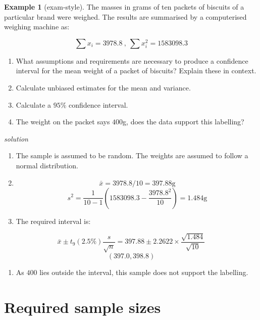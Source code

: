\documentclass[
]{book}
\providecommand{\tightlist}{%
  \setlength{\itemsep}{0pt}\setlength{\parskip}{0pt}}
\theoremstyle{definition}
\theoremstyle{definition}
\newtheorem{example}{Example}[chapter]
\theoremstyle{definition}
\theoremstyle{definition}
\theoremstyle{remark}
\begin{document}
\begin{example}[exam-style]

The masses in grams of ten packets of biscuits of a particular brand were weighed. The results are summarised by a computerised weighing machine as:

\[\sum x_i = 3978.8 \ , \ \sum x_i^2 = 1583098.3 \]

\begin{enumerate}
\def\labelenumi{\alph{enumi})}
\item
  What assumptions and requirements are necessary to produce a
  confidence interval for the mean weight of a packet of biscuits? Explain these in context.
\item
  Calculate unbiased estimates for the mean and variance.
\item
  Calculate a \(95\%\) confidence interval.
\item
  The weight on the packet says \(400\)g, does the data support this labelling?
\end{enumerate}

\end{example}

\emph{solution}

\begin{enumerate}
\def\labelenumi{\alph{enumi})}
\item
  The sample is assumed to be random. The weights are assumed to follow a normal distribution.
\item
  \[\bar{x} = 3978.8/10 = 397.88\text{g}\]
  \[s^2 = \frac{1}{10-1}\left(1583098.3-\frac{3978.8^2}{10}\right) =1.484\text{g}\]
\item
  The required interval is:
\end{enumerate}

\[\bar{x} \pm t_{9}(2.5\%)\frac{s}{\sqrt{n}} = 397.88 \pm 2.2622\times \frac{\sqrt{1.484}}{\sqrt{10}}\]
\[(397.0,398.8 ) \]

\begin{enumerate}
\def\labelenumi{\alph{enumi})}
\setcounter{enumi}{3}
\tightlist
\item
  As \(400\) lies outside the interval, this sample does not support the labelling.
\end{enumerate}

\hypertarget{required-sample-sizes}{%
\section{Required sample sizes}\label{required-sample-sizes}}
\end{document}
